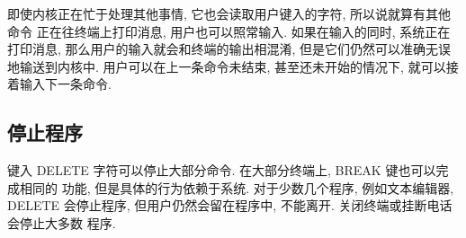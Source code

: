 即使内核正在忙于处理其他事情, 它也会读取用户键入的字符, 所以说就算有其他命令
正在往终端上打印消息, 用户也可以照常输入. 如果在输入的同时, 系统正在打印消息,
那么用户的输入就会和终端的输出相混淆, 但是它们仍然可以准确无误地输送到内核中.
用户可以在上一条命令未结束, 甚至还未开始的情况下, 就可以接着输入下一条命令.

\subsection{停止程序}
\label{subsec:stopping_a_program}

键入 DELETE 字符可以停止大部分命令. 在大部分终端上, BREAK 键也可以完成相同的
功能, 但是具体的行为依赖于系统. 对于少数几个程序, 例如文本编辑器, DELETE
会停止程序, 但用户仍然会留在程序中, 不能离开. 关闭终端或挂断电话会停止大多数
程序.
